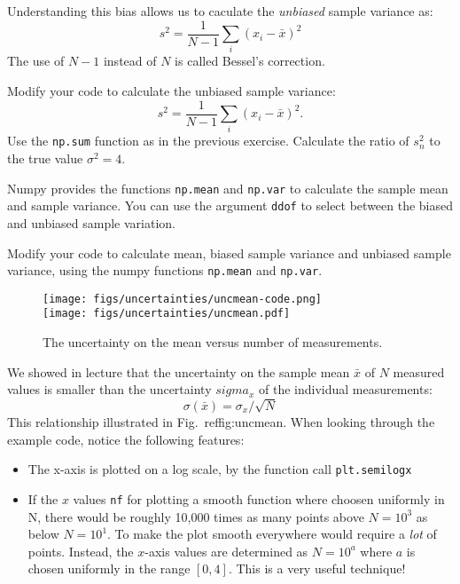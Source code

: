 Understanding this bias allows us to caculate the {\em unbiased} sample variance as:
\begin{displaymath}
s^2 = \frac{1}{N-1}\sum_i (x_i - \bar{x})^2 
\end{displaymath}
The use of $N-1$ instead of $N$ is called Bessel's correction.

\begin{plot}\end{plot}
Modify your code to calculate the unbiased sample variance:
\begin{displaymath}
s^2  = \frac{1}{N-1} \sum_i (x_i-\bar{x})^2.
\end{displaymath}
Use the {\tt np.sum} function as in the previous exercise.  Calculate the ratio of $s^2_n$ to the true value $\sigma^2 = 4$.

Numpy provides the functions {\tt np.mean} and {\tt np.var} to
calculate the sample mean and sample variance.  You can use the
argument {\tt ddof} to select between the biased and unbiased sample
variation.

\begin{plot}\end{plot}
Modify your code to calculate mean, biased sample variance and
unbiased sample variance, using the numpy functions {\tt np.mean} and
{\tt np.var}.
  
\begin{figure}[htbp]
\begin{center}
\texttt{[image: figs/uncertainties/uncmean-code.png]}\\
\texttt{[image: figs/uncertainties/uncmean.pdf]}\\
\end{center}
\caption{\label{fig:uncmean} The uncertainty on the mean versus number of measurements.}
\end{figure}

We showed in lecture that the uncertainty on the sample mean $\bar{x}$ of $N$ measured values is smaller than the uncertainty $sigma_x$ of the individual measurements:
\begin{displaymath}
\sigma(\bar{x}) = \sigma_x / \sqrt{N}
\end{displaymath}
This relationship illustrated in Fig.~ref{fig:uncmean}. When looking through the example code, notice the following features:
\begin{itemize}
\item The x-axis is plotted on a log scale, by the function call {\tt plt.semilogx}
\item If the $x$ values {\tt nf} for plotting a smooth function where
  choosen uniformly in N, there would be roughly 10,000 times as many
  points above $N=10^3$ as below $N=10^1$.  To make the plot smooth
  everywhere would require a {\em lot} of points.  Instead, the
  $x$-axis values are determined as $N = 10^a$ where $a$ is chosen
  uniformly in the range $[0,4]$.  This is a very useful technique!
\end{itemize}

